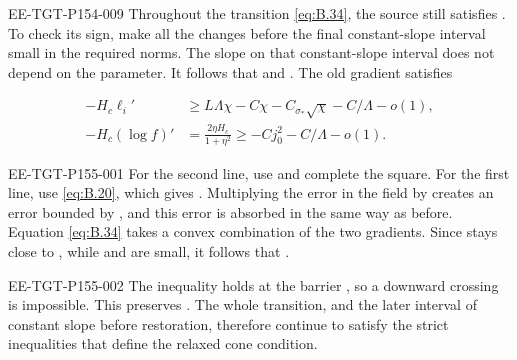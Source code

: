 \begin{EESegment}{EE-TGT-P154-009}
Throughout the transition \eqref{eq:B.34}, the source still satisfies
. To check its sign, make all the changes before the final
 constant-slope interval small in the required
 norms. The slope on that constant-slope interval does not depend on
the parameter. It follows that
%
%
 and
. The old gradient satisfies
\end{EESegment}
\[
\begin{aligned}
  -H_c\ell_i'&\geq L\Lambda\chi-C\chi-C_{\sigma_*}\sqrt\chi-C/\Lambda-o(1),\\
  -H_c(\log f)'&=\frac{2\eta H_c}{1+\eta^2}\geq-Cj_0^2-C/\Lambda-o(1).
\end{aligned}
\]
\begin{EESegment}{EE-TGT-P155-001}
For the second line, use  and complete the
square. For the first line, use \eqref{eq:B.20}, which gives
. Multiplying the
 error in the field by
 creates an error bounded by
, and this error is absorbed in the same way as before.
Equation \eqref{eq:B.34} takes a convex combination of the two gradients. Since
 stays close to , while
 and  are small, it follows that
.
\end{EESegment}

\begin{EESegment}{EE-TGT-P155-002}
The inequality  holds at the barrier
, so a downward crossing is impossible. This preserves
. The whole transition, and the later interval of constant slope before
restoration, therefore continue to satisfy the strict inequalities that define the relaxed cone
condition.
\end{EESegment}


